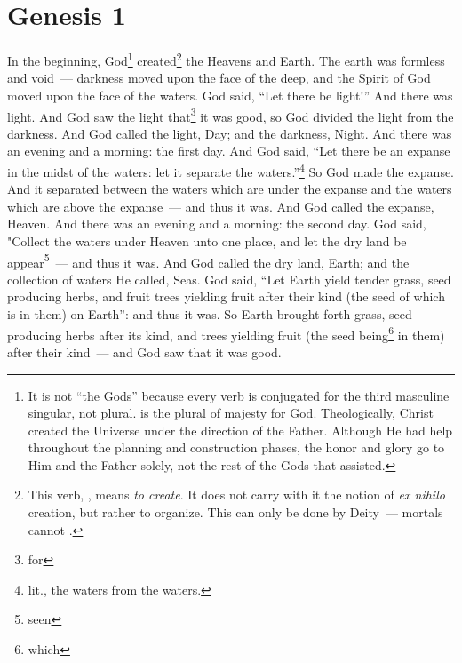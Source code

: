 \section{Genesis 1}\label{Genesis 1}
\begin{enumerate}[align=center]
     In the beginning, God\footnote{It is not ``the Gods'' because every verb is conjugated for the third masculine singular, not plural.  is the plural of majesty for God. Theologically, Christ created the Universe under the direction of the Father. Although He had help throughout the planning and construction phases, the honor and glory go to Him and the Father solely, not the rest of the Gods that assisted.} created\footnote{This verb, , means \emph{to create}. It does not carry with it the notion of \emph{ex nihilo} creation, but rather to organize. This can only be done by Deity~--- mortals cannot .} the Heavens and Earth.%
     The earth was formless and void~--- darkness moved upon the face of the deep, and the Spirit of God moved upon the face of the waters.%
     God said, ``Let there be light!'' And there was light.%
     And God saw the light that\footnote{for} it was good, so God divided the light from the darkness.%
     And God called the light, Day; and the darkness, Night. And there was an evening and a morning: the first day.%
     And God said, ``Let there be an expanse in the midst of the waters: let it separate the waters.''\footnote{lit., the waters from the waters.}%
     So God made the expanse. And it separated between the waters which are under the expanse and the waters which are above the expanse~--- and thus it was.%
     And God called the expanse, Heaven. And there was an evening and a morning: the second day.%
     God said, "Collect the waters under Heaven unto one place, and let the dry land be appear\footnote{seen}~--- and thus it was.%
     And God called the dry land, Earth; and the collection of waters He called, Seas.%
     God said, ``Let Earth yield tender grass, seed producing herbs, and fruit trees yielding fruit after their kind (the seed of which is in them) on Earth'': and thus it was.%
     So Earth brought forth grass, seed producing herbs after its kind, and trees yielding fruit (the seed being\footnote{which} in them) after their kind~--- and God saw that it was good.%

\end{enumerate}
